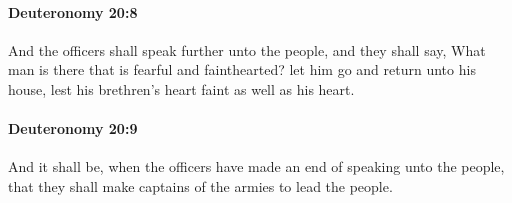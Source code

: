 		\paragraph{Deuteronomy 20:8} %
			\label{DEUTERONOMY-20-8}

			And the officers shall speak further unto the people, and they shall say, What man is there that is fearful and fainthearted? let him go and return unto his house, lest his brethren's heart faint as well as his heart.


		\paragraph{Deuteronomy 20:9} %
			\label{DEUTERONOMY-20-9}

			And it shall be, when the officers have made an end of speaking unto the people, that they shall make captains of the armies to lead the people.

